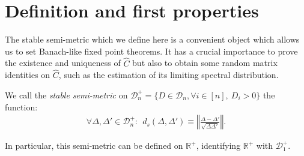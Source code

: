 \documentclass[a4papaer, titlepage]{book}
\begin{document}











\section{Definition and first properties}\label{classe_stable_R}

The stable semi-metric which we define here is a convenient object which allows us to set Banach-like fixed point theorems. It has a crucial importance to prove the existence and uniqueness of $\hat C$ but also to obtain some random matrix identities on $\hat C$, such as the estimation of its limiting spectral distribution. 
\begin{definition}\label{def:distance_stable}
  We call the \emph{stable semi-metric} on $\mathcal D_n^+ = \{D\in \mathcal D_n, \forall i \in [n], \ D_i>0\}$ the function:
  \begin{align}\label{eq:definition_stable_metric}
    \forall \Delta,\Delta' \in \mathcal D_n^+ : \ \ d_s(\Delta, \Delta') \equiv  \left\Vert  \frac{ \Delta- \Delta'}{\sqrt{\Delta \Delta'}}\right\Vert.
  \end{align}
\end{definition}


In particular, this semi-metric can be defined on $\mathbb R^+$, identifying $\mathbb R^+$ with $\mathcal D_1^+$. 
\end{document}
